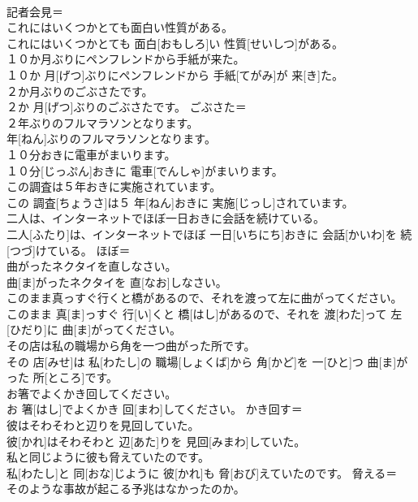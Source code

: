 \documentclass[8pt]{extreport}
\begin{document}
\begin{CJK}{UTF8}{min}
\\	記者会見＝ 
\\	これにはいくつかとても面白い性質がある。	
\\	これにはいくつかとても 面白[おもしろ]い 性質[せいしつ]がある。	
\\	１０か月ぶりにペンフレンドから手紙が来た。	
\\	１０か 月[げつ]ぶりにペンフレンドから 手紙[てがみ]が 来[き]た。	
\\	２か月ぶりのごぶさたです。	
\\	２か 月[げつ]ぶりのごぶさたです。	ごぶさた＝ 
\\	２年ぶりのフルマラソンとなります。	
\\	年[ねん]ぶりのフルマラソンとなります。	
\\	１０分おきに電車がまいります。	
\\	１０分[じっぷん]おきに 電車[でんしゃ]がまいります。	
\\	この調査は５年おきに実施されています。	
\\	この 調査[ちょうさ]は５ 年[ねん]おきに 実施[じっし]されています。	
\\	二人は、インターネットでほぼ一日おきに会話を続けている。	
\\	二人[ふたり]は、インターネットでほぼ 一日[いちにち]おきに 会話[かいわ]を 続[つづ]けている。	ほぼ＝ 
\\	曲がったネクタイを直しなさい。	
\\	曲[ま]がったネクタイを 直[なお]しなさい。	
\\	このまま真っすぐ行くと橋があるので、それを渡って左に曲がってください。	
\\	このまま 真[ま]っすぐ 行[い]くと 橋[はし]があるので、それを 渡[わた]って 左[ひだり]に 曲[ま]がってください。	
\\	その店は私の職場から角を一つ曲がった所です。	
\\	その 店[みせ]は 私[わたし]の 職場[しょくば]から 角[かど]を 一[ひと]つ 曲[ま]がった 所[ところ]です。	
\\	お箸でよくかき回してください。	
\\	お 箸[はし]でよくかき 回[まわ]してください。	かき回す＝ 
\\	彼はそわそわと辺りを見回していた。	
\\	彼[かれ]はそわそわと 辺[あた]りを 見回[みまわ]していた。	
\\	私と同じように彼も脅えていたのです。	
\\	私[わたし]と 同[おな]じように 彼[かれ]も 脅[おび]えていたのです。	脅える＝ 
\\	そのような事故が起こる予兆はなかったのか。	

\end{CJK}
\end{document}
